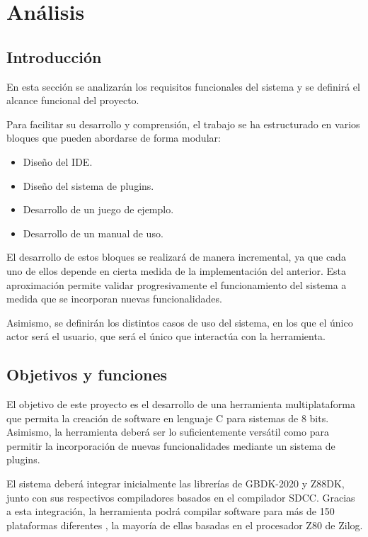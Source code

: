 \documentclass[../../main.tex]{subfiles}
\begin{document}
\chapter{Análisis}
\label{C:analisis}

\section{Introducción}

En esta sección se analizarán los requisitos funcionales del sistema y se definirá el alcance funcional del proyecto.

\par{Para facilitar su desarrollo y comprensión, el trabajo se ha estructurado en varios bloques que pueden abordarse de forma modular:}

\begin{itemize}
    \item Diseño del IDE. 
    \item Diseño del sistema de plugins.
    \item Desarrollo de un juego de ejemplo.
    \item Desarrollo de un manual de uso.
\end{itemize}

\par{El desarrollo de estos bloques se realizará de manera incremental, ya que cada uno de ellos depende en cierta medida de la implementación del anterior. Esta aproximación permite validar progresivamente el funcionamiento del sistema a medida que se incorporan nuevas funcionalidades.}

\par{Asimismo, se definirán los distintos casos de uso del sistema, en los que el único actor será el usuario, que será el único que interactúa con la herramienta.}

\clearpage

\section{Objetivos y funciones}

El objetivo de este proyecto es el desarrollo de una herramienta multiplataforma que permita la creación de software en lenguaje C para sistemas de 8 bits. Asimismo, la herramienta deberá ser lo suficientemente versátil como para permitir la incorporación de nuevas funcionalidades mediante un sistema de plugins.

\par{El sistema deberá integrar inicialmente las librerías de GBDK-2020 y Z88DK, junto con sus respectivos compiladores basados en el compilador SDCC. Gracias a esta integración, la herramienta podrá compilar software para más de 150 plataformas diferentes \cite{z88dk_platforms} \cite{gbdk_supported_consoles}, la mayoría de ellas basadas en el procesador Z80 de Zilog.}
\end{document}
